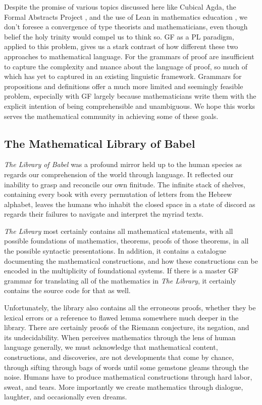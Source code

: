 Despite the promise of various topics discussed here like Cubical Agda, the
Formal Abstracts Project , and the use of Lean in mathematics education
\cite{buzzard2020will}, we don't foresee a convergence of type theorists and
mathematicians, even though belief the holy trinity would compel us to think so.
GF as a PL paradigm, applied to this problem, gives us a stark contrast of how
different these two approaches to mathematical language. For the grammars of
proof are insufficient to capture the complexity and nuance about the language
of proof, so much of which has yet to captured in an existing linguistic
framework. Grammars for propositions and definitions offer a much more limited
and seemingly feasible problem, especially with GF largely because
mathematicians write them with the explicit intention of being comprehensible
and unambiguous. We hope this works serves the mathematical community in
achieving some of these goals.

\subsection{The Mathematical Library of Babel}

\emph{The Library of Babel} \cite{borges} was a profound mirror held up to the human species
as regards our comprehension of the world through language. It reflected our
inability to grasp and reconcile our own finitude. The infinite stack of
shelves, containing every book with every permutation of letters from the Hebrew
alphabet, leaves the humans who inhabit the closed space in a state of discord
as regards their failures to navigate and interpret the myriad texts.

\emph{The Library} most certainly contains all mathematical statements, with all
possible foundations of mathematics, theorems, proofs of those theorems, in all
the possible syntactic presentations. In addition, it contains a catalogue
documenting the mathematical constructions, and how these constructions can be
encoded in the multiplicity of foundational systems. If there is a master GF
grammar for translating all of the mathematics in \emph{The Library}, it certainly
contains the source code for that as well.

Unfortunately, the library also contains all the erroneous proofs, whether they
be lexical errors or a reference to flawed lemma somewhere much deeper in the
library. There are certainly proofs of the Riemann conjecture, its negation, and
its undecidability. When perceives mathematics through the lens of human
language generally, we must acknowledge that mathematical content,
constructions, and discoveries, are not developments that come by chance,
through sifting through bags of words until some gemstone gleams through the
noise. Humans have to produce mathematical constructions through hard labor,
sweat, and tears. More importantly we create mathematics through dialogue,
laughter, and occasionally even dreams.

